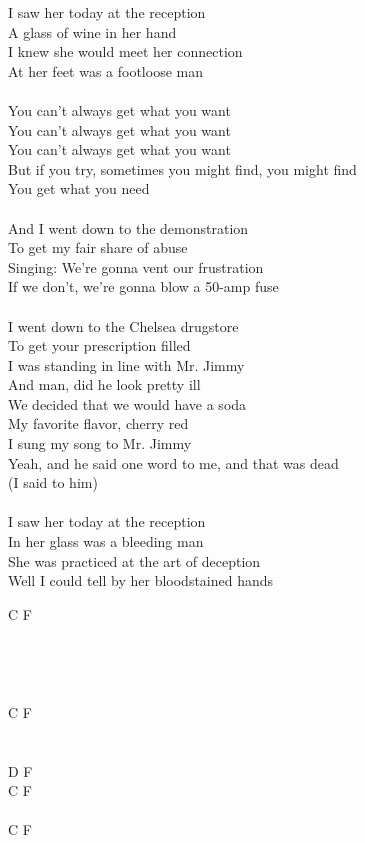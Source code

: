 \documentclass[a5paper, 10pt]{book}
\begin{document}
\begin{minipage}[t]{0.8\textwidth}
I saw her today at the reception\\
A glass of wine in her hand\\
I knew she would meet her connection\\
At her feet was a footloose man\\
\\
\hspace*{5mm}You can't always get what you want				\\
\hspace*{5mm}You can't always get what you want\\
\hspace*{5mm}You can't always get what you want\\
\hspace*{5mm}But if you try, sometimes you might find, you might find\\
\hspace*{5mm}You get what you need		\\
\\
And I went down to the demonstration\\
To get my fair share of abuse\\
Singing: We're gonna vent our frustration\\
If we don't, we're gonna blow a 50-amp fuse\\
\\
I went down to the Chelsea drugstore\\
To get your prescription filled\\
I was standing in line with Mr. Jimmy\\
And man, did he look pretty ill\\
We decided that we would have a soda\\
My favorite flavor, cherry red\\
I sung my song to Mr. Jimmy\\
Yeah, and he said one word to me, and that was dead\\
(I said to him)\\
\\
I saw her today at the reception\\
In her glass was a bleeding man\\
She was practiced at the art of deception\\
Well I could tell by her bloodstained hands\\
\end{minipage}
\begin{minipage}[t]{0.2\textwidth}
C F\\
~\\
~\\
~\\
~\\
C F\\
~\\
~\\
D F\\
C F\\
\\
C F\\
\end{minipage}
\end{document}
